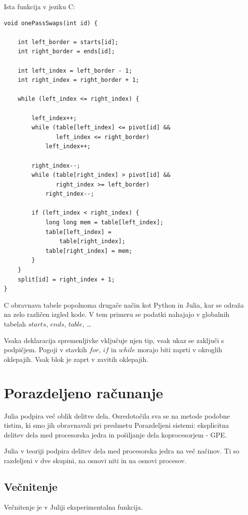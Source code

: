 \documentclass[journal,a4paper,twoside]{sty/IEEEtran}
\begin{document}
Ista funkcija v jeziku C:
\begin{lstlisting}
void onePassSwaps(int id) {

    int left_border = starts[id];
    int right_border = ends[id];

    int left_index = left_border - 1;
    int right_index = right_border + 1;

    while (left_index <= right_index) {

        left_index++;
        while (table[left_index] <= pivot[id] &&
               left_index <= right_border)
            left_index++;

        right_index--;
        while (table[right_index] > pivot[id] &&
               right_index >= left_border)
            right_index--;

        if (left_index < right_index) {
            long long mem = table[left_index];
            table[left_index] =
                table[right_index];
            table[right_index] = mem;
        }
    }
    split[id] = right_index + 1;
}
\end{lstlisting}

C obravnava tabele popolnoma drugače način kot Python in Julia, kar se odraža na zelo različen izgled kode.
V tem primeru se podatki nahajajo v globalnih tabelah $starts$, $ends$, $table$, \ldots

Vsaka deklaracija spremenljivke vključuje njen tip, vsak ukaz se zaključi s podpičjem.
Pogoji v stavkih $for$, $if$ in $while$ morajo biti zaprti v okroglih oklepajih.
Vsak blok je zaprt v zavitih oklepajih.

\section{Porazdeljeno računanje}

Julia podpira več oblik delitve dela.
Osredotočila sva se na metode podobne tistim, ki smo jih obravnavali pri predmetu Porazdeljeni sistemi: eksplicitna delitev dela med procesorska jedra in
	pošiljanje dela koprocesorjem - GPE.

Julia v teoriji podpira delitev dela med procesorska jedra na več načinov.
Ti so razdeljeni v dve skupini, na osnovi niti in na osnovi procesov.

\subsection{Večnitenje}

Večnitenje je v Juliji eksperimentalna funkcija.
\end{document}

